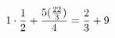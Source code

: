 \documentclass[preview]{standalone}
\begin{document}
\begin{align*}
\special{dvisvgm:raw <g id='unique000'>}1 \cdot \frac{1}{2} + \frac{5 (\frac{22}{3})}{4} = \frac{2}{3} + 9\special{dvisvgm:raw </g>}
\end{align*}
\end{document}
